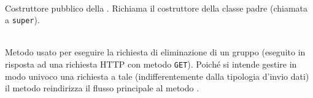 \begin{description}
	\item{}\\
	Costruttore pubblico della . Richiama il costruttore della classe padre (chiamata a \texttt{super}).
	
	\item{}\\
	Metodo usato per eseguire la richiesta di eliminazione di un gruppo (eseguito in risposta ad una richiesta HTTP con metodo \texttt{GET}). Poiché si intende gestire in modo univoco una richiesta a tale  (indifferentemente dalla tipologia d'invio dati) il metodo reindirizza il flusso principale al metodo .
	

\end{description}
